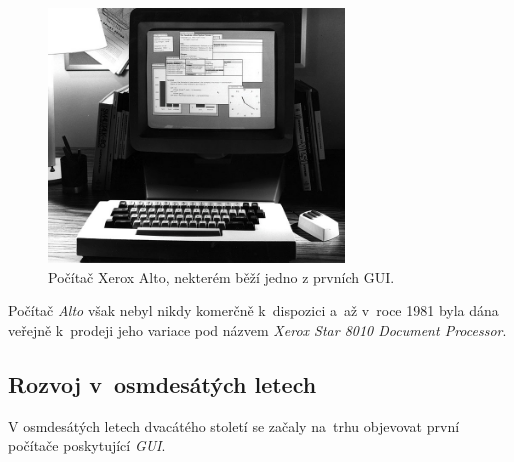 \documentclass[11pt,twoside,a4paper]{book}
\begin{document}
\begin{figure}[!ht]
\begin{center}
  \includegraphics[width=0.7\textwidth]{altost2}
\caption{{\label{fig:altoGUI}}Počítač Xerox Alto, nekterém běží jedno z prvních GUI.}
\end{center}
\end{figure}
Počítač \textit{Alto} však nebyl nikdy komerčně k~dispozici a~až v~roce 1981 byla dána veřejně k~prodeji jeho variace pod názvem \textit{Xerox Star 8010 Document Processor}.

\subsection{Rozvoj v~osmdesátých letech}
V osmdesátých letech dvacátého století se začaly na~trhu objevovat první počítače poskytující \textit{GUI}.\cite{bib:history}
\end{document}
